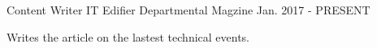 \begin{cventries}
  \cventry
    {Content Writer}
    {IT Edifier}
    {Departmental Magzine}
    {Jan. 2017 - PRESENT}
    {
      \begin{cvitems}
        \item {Writes the article on the lastest technical events.}
      \end{cvitems}
    }
 
\end{cventries}
